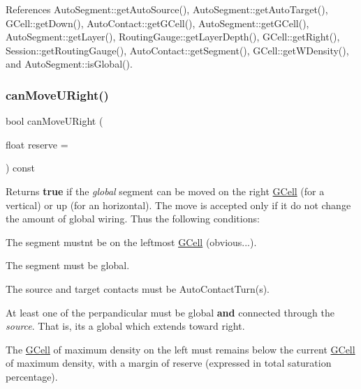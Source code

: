 References Auto\+Segment\+::get\+Auto\+Source(), Auto\+Segment\+::get\+Auto\+Target(), G\+Cell\+::get\+Down(), Auto\+Contact\+::get\+G\+Cell(), Auto\+Segment\+::get\+G\+Cell(), Auto\+Segment\+::get\+Layer(), Routing\+Gauge\+::get\+Layer\+Depth(), G\+Cell\+::get\+Right(), Session\+::get\+Routing\+Gauge(), Auto\+Contact\+::get\+Segment(), G\+Cell\+::get\+W\+Density(), and Auto\+Segment\+::is\+Global().

\mbox{\label{classKatabatic_1_1AutoHorizontal_ad0c972e34d6bac47bd9276a7d6e053d8}} 
\subsubsection{\texorpdfstring{can\+Move\+U\+Right()}{canMoveURight()}}
{\footnotesize\ttfamily bool can\+Move\+U\+Right (\begin{DoxyParamCaption}\item[{float}]{reserve = {} }\end{DoxyParamCaption}) const\hspace{0.3cm}{\ttfamily [virtual]}}

\begin{DoxyReturn}{Returns}
{\bfseries true} if the {\itshape global} segment can be moved on the right \hyperlink{classKatabatic_1_1GCell}{G\+Cell} (for a vertical) or up (for an horizontal). The move is accepted only if it do not change the amount of global wiring. Thus the following conditions\+:
\begin{DoxyItemize}
\item The segment mustn\textquotesingle{}t be on the leftmost \hyperlink{classKatabatic_1_1GCell}{G\+Cell} (obvious...).
\item The segment must be global.
\item The source and target contacts must be Auto\+Contact\+Turn(s).
\item At least one of the perpandicular must be global {\bfseries and} connected through the {\itshape source}. That is, it\textquotesingle{}s a global which extends toward right.
\item The \hyperlink{classKatabatic_1_1GCell}{G\+Cell} of maximum density on the left must remains below the current \hyperlink{classKatabatic_1_1GCell}{G\+Cell} of maximum density, with a margin of {\ttfamily reserve} (expressed in total saturation percentage). 
\end{DoxyItemize}
\end{DoxyReturn}


